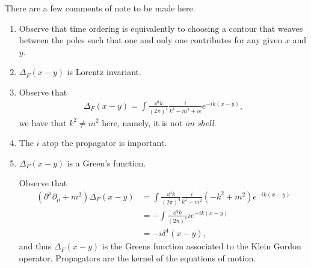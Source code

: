 There are a few comments of note to be made here.
\begin{enumerate}[label=\arabic*)]
    \item Observe that time ordering is equivalently to choosing a contour that weaves between the poles such that one and only one contributes for any given $x$ and $y$.
    \item $\Delta_F \left( x -y \right) $ is Lorentz invariant.
    \item Observe that
        \begin{align}
            \Delta_F \left( x - y \right) = \int \frac{\dd{^{4}k}}{\left( 2\pi \right)^{4}} \frac{i}{k^2 - m^2 + i \epsilon} e^{-i k \left( x -y \right) }
        ,\end{align}
        we have that $k^2 \neq m^2$ here, namely, it is not \textit{on shell}.
    \item The $i$ atop the propagator is important.
    \item $\Delta_F \left( x -y \right) $ is a Green's function.

        Observe that
        \begin{align}
            \left( \partial^{\mu} \partial_\mu + m^2 \right) \Delta_{F}\left( x - y \right) &= \int \frac{\dd{^{4}k}}{\left( 2\pi \right)^{4}} \frac{i}{k^2 - m^2} \left( - k^2 + m^2 \right) e^{-i k \left( x -y \right) } \\
            &= - \int \frac{\dd{^4k}}{\left( 2\pi\right)^4} i e^{-i k \left( x - y \right) } \\
            &= -i \delta^{4} \left( x - y \right) 
        ,\end{align}
        and thus $\Delta_F \left( x -y \right) $ is the Greens function associated to the Klein Gordon operator. Propagators are the kernel of the equations of motion.
\end{enumerate}

